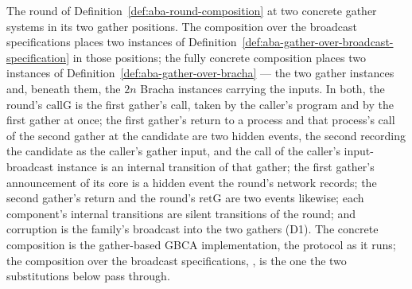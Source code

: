 \begin{definition}
  \label{def:aba-round-over-bracha}
  \leanok
  The round of Definition~\ref{def:aba-round-composition} at two concrete gather systems in its two gather positions.
  The composition over the broadcast specifications places two instances of Definition~\ref{def:aba-gather-over-broadcast-specification} in those positions; the fully concrete composition places two instances of Definition~\ref{def:aba-gather-over-bracha} --- the two gather instances and, beneath them, the $2n$ Bracha instances carrying the inputs.
  In both, the round's $\mathrm{callG}$ is the first gather's call, taken by the caller's program and by the first gather at once; the first gather's return to a process and that process's call of the second gather at the candidate are two hidden events, the second recording the candidate as the caller's gather input, and the call of the caller's input-broadcast instance is an internal transition of that gather; the first gather's announcement of its core is a hidden event the round's network records; the second gather's return and the round's $\mathrm{retG}$ are two events likewise; each component's internal transitions are silent transitions of the round; and corruption is the family's broadcast into the two gathers (D1).
  The concrete composition  is the gather-based GBCA implementation, the protocol as it runs; the composition over the broadcast specifications, , is the one the two substitutions below pass through.
\end{definition}
